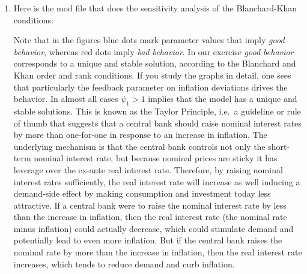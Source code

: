 \begin{enumerate}
\item Here is the mod file that does the sensitivity analysis of the Blanchard-Khan conditions:

Note that in the figures blue dots mark parameter values that imply \emph{good behavior},
  whereas red dots imply \emph{bad behavior}.
In our exercise \emph{good behavior} corresponds to a unique and stable solution,
  according to the Blanchard and Khan order and rank conditions.
If you study the graphs in detail, one sees that particularly the feedback parameter on inflation deviations drives the behavior.
In almost all cases $\psi_1>1$ implies that the model has a unique and stable solutions.
This is known as the Taylor Principle, i.e.\ a guideline or rule of thumb that suggests that a central bank should raise nominal interest rates
  by more than one-for-one in response to an increase in inflation.
The underlying mechanism is that the central bank controls not only the short-term nominal interest rate,
  but because nominal prices are sticky it has leverage over the ex-ante real interest rate.
Therefore, by raising nominal interest rates sufficiently, the real interest rate will increase as well inducing a demand-side effect by making consumption and investment today less attractive.
If a central bank were to raise the nominal interest rate by less than the increase in inflation,
  then the real interest rate (the nominal rate minus inflation) could actually decrease, which could stimulate demand and potentially lead to even more inflation.
But if the central bank raises the nominal rate by more than the increase in inflation, then the real interest rate increases, which tends to reduce demand and curb inflation.


\end{enumerate}
